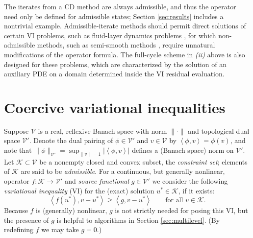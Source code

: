 \documentclass[letterpaper,final,12pt,reqno]{amsart}
\theoremstyle{cstyle}
\theoremstyle{cstyle*}
\theoremstyle{dstyle}
\numberwithin{equation}{section}
\numberwithin{figure}{section}
\numberwithin{table}{section}
\numberwithin{theorem}{section}
\newcommand{\cK}{\mathcal{K}}
\newcommand{\cV}{\mathcal{V}}
\newcommand{\ip}[2]{\left<#1,#2\right>}
\begin{document}
The iterates from a CD method are always admissible, and thus the operator need only be defined for admissible states; Section \ref{sec:results} includes a nontrivial example.  Admissible-iterate methods should permit direct solutions of certain VI problems, such as fluid-layer dynamics problems \cite{Bueler2021conservation,JouvetBueler2012}, for which non-admissible methods, such as semi-smooth methods \cite{BensonMunson2006}, require unnatural modifications of the operator formula.  The full-cycle scheme in \emph{(ii)} above is also designed for these problems, which are characterized by the solution of an auxiliary PDE on a domain determined inside the VI residual evaluation.



\section{Coercive variational inequalities} \label{sec:vi}

Suppose $\cV$ is a real, reflexive Banach space with norm $\|\cdot\|$ and topological dual space $\cV'$.  Denote the dual pairing of $\phi \in \cV'$ and $v\in\cV$ by $\ip{\phi}{v} = \phi(v)$, and note that $\|\phi\|_{\cV'} = \sup_{\|v\|=1} |\ip{\phi}{v}|$ defines a (Banach space) norm on $\cV'$.  Let $\cK \subset \cV$ be a nonempty closed and convex subset, the \emph{constraint set}; elements of $\cK$ are said to be \emph{admissible}.  For a continuous, but generally nonlinear, operator $f:\cK \to \cV'$ and \emph{source functional} $g\in \cV'$ we consider the following \emph{variational inequality} (VI) for the (exact) solution $u^*\in \cK$, if it exists:
\begin{equation}
\ip{f(u^*)}{v-u^*} \ge \ip{g}{v-u^*} \qquad \text{for all } v\in \cK. \label{eq:vi}
\end{equation}
Because $f$ is (generally) nonlinear, $g$ is not strictly needed for posing this VI,  but the presence of $g$ is helpful to algorithms in Section \ref{sec:multilevel}.  (By redefining $f$ we may take $g=0$.)
\end{document}
